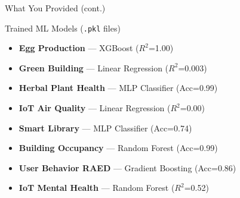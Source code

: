 \documentclass[aspectratio=169]{beamer}
\begin{document}
\begin{frame}{What You Provided (cont.)}
  \begin{block}{Trained ML Models (\texttt{.pkl} files)}
    \begin{itemize}
      \item \textbf{Egg Production} --- XGBoost ($R^2$=1.00)
      \item \textbf{Green Building} --- Linear Regression ($R^2$=0.003)
      \item \textbf{Herbal Plant Health} --- MLP Classifier (Acc=0.99)
      \item \textbf{IoT Air Quality} --- Linear Regression ($R^2$=0.00)
      \item \textbf{Smart Library} --- MLP Classifier (Acc=0.74)
      \item \textbf{Building Occupancy} --- Random Forest (Acc=0.99)
      \item \textbf{User Behavior RAED} --- Gradient Boosting (Acc=0.86)
      \item \textbf{IoT Mental Health} --- Random Forest ($R^2$=0.52)
    \end{itemize}
  \end{block}
\end{frame}
\end{document}
